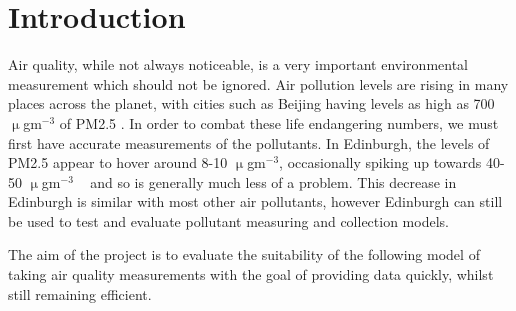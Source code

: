 \section{Introduction}\label{intro}


Air quality, while not always noticeable, is a very important environmental measurement which should not be ignored. Air pollution levels are rising in many places across the planet, with cities such as Beijing having levels as high as 700 $\upmu$gm$^{-3}$ of PM2.5 . In order to combat these life endangering numbers, we must first have accurate measurements of the pollutants. In Edinburgh, the levels of PM2.5 appear to hover around 8-10 $\upmu$gm$^{-3}$, occasionally spiking up towards 40-50 $\upmu$gm$^{-3}$ ~\cite{pm2point5inscotland} and so is generally much less of a problem. This decrease in Edinburgh is similar with most other air pollutants, however Edinburgh can still be used to test and evaluate pollutant measuring and collection models. 

The aim of the project is to evaluate the suitability of the following model  of taking air quality measurements with the goal of providing data quickly, whilst still remaining efficient. 


